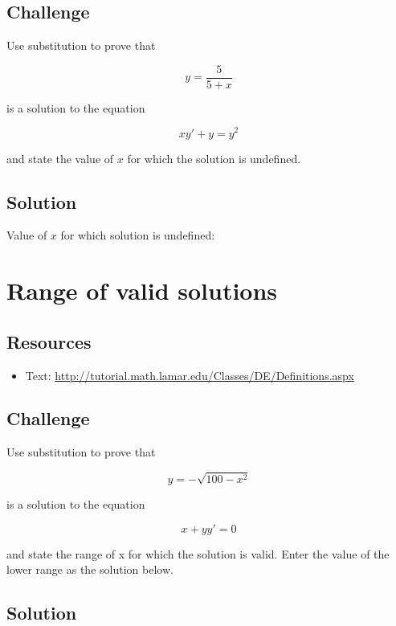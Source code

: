 \subsection*{Challenge}

Use substitution to prove that

\begin{equation}
    y=\frac{5}{5+x}
\end{equation}

is a solution to the equation

\begin{equation}
    x y'+y=y^2
\end{equation}

and state the value of $x$ for which the solution is undefined.

\subsection*{Solution}
Value of $x$ for which solution is undefined: \six{}





\newpage

\section{Range of valid solutions}

\subsection*{Resources}
\begin{itemize}
    \item Text: \url{http://tutorial.math.lamar.edu/Classes/DE/Definitions.aspx}
\end{itemize}

\subsection*{Challenge}

Use substitution to prove that

\begin{equation}
    y = -\sqrt{100-x^2}
\end{equation}

is a solution to the equation

\begin{equation}
    x + y y' = 0
\end{equation}

and state the range of x for which the solution is valid. Enter the value of the lower range as the solution below.

\subsection*{Solution}
\six{}

